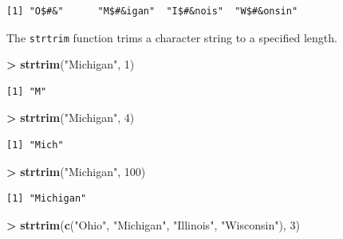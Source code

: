 \documentclass[]{krantz}
\makeatletter
\newenvironment{Shaded}{\begin{snugshade}}{\end{snugshade}}
\newcommand{\KeywordTok}[1]{\textcolor[rgb]{0.27,0.27,0.27}{\textbf{#1}}}
\newcommand{\DecValTok}[1]{\textcolor[rgb]{0.06,0.06,0.06}{#1}}
\newcommand{\StringTok}[1]{\textcolor[rgb]{0.5,0.5,0.5}{#1}}
\newcommand{\OperatorTok}[1]{\textcolor[rgb]{0.43,0.43,0.43}{\textbf{#1}}}
\newcommand{\NormalTok}[1]{#1}
\newenvironment{kframe}{%
\medskip{}
\setlength{\fboxsep}{.8em}
 \def\at@end@of@kframe{}%
 \ifinner\ifhmode%
  \def\at@end@of@kframe{\end{minipage}}%
  \begin{minipage}{\columnwidth}%
 \fi\fi%
 \def\FrameCommand##1{\hskip\@totalleftmargin \hskip-\fboxsep
 \colorbox{shadecolor}{##1}\hskip-\fboxsep
     \hskip-\linewidth \hskip-\@totalleftmargin \hskip\columnwidth}%
 \MakeFramed {\advance\hsize-\width
   \@totalleftmargin\z@ \linewidth\hsize
   \@setminipage}}%
 {\par\unskip\endMakeFramed%
 \at@end@of@kframe}
\renewenvironment{Shaded}{\begin{kframe}}{\end{kframe}}
\makeatother
\begin{document}
\begin{Shaded}
\end{Shaded}

\begin{verbatim}
[1] "O$#&"      "M$#&igan"  "I$#&nois"  "W$#&onsin"
\end{verbatim}

The \texttt{strtrim} function trims a character string to a specified
length.

\begin{Shaded}
\begin{Highlighting}[]
\OperatorTok{>}\StringTok{ }\KeywordTok{strtrim}\NormalTok{(}\StringTok{"Michigan"}\NormalTok{, }\DecValTok{1}\NormalTok{)}
\end{Highlighting}
\end{Shaded}

\begin{verbatim}
[1] "M"
\end{verbatim}

\begin{Shaded}
\begin{Highlighting}[]
\OperatorTok{>}\StringTok{ }\KeywordTok{strtrim}\NormalTok{(}\StringTok{"Michigan"}\NormalTok{, }\DecValTok{4}\NormalTok{)}
\end{Highlighting}
\end{Shaded}

\begin{verbatim}
[1] "Mich"
\end{verbatim}

\begin{Shaded}
\begin{Highlighting}[]
\OperatorTok{>}\StringTok{ }\KeywordTok{strtrim}\NormalTok{(}\StringTok{"Michigan"}\NormalTok{, }\DecValTok{100}\NormalTok{)}
\end{Highlighting}
\end{Shaded}

\begin{verbatim}
[1] "Michigan"
\end{verbatim}

\begin{Shaded}
\begin{Highlighting}[]
\OperatorTok{>}\StringTok{ }\KeywordTok{strtrim}\NormalTok{(}\KeywordTok{c}\NormalTok{(}\StringTok{"Ohio"}\NormalTok{, }\StringTok{"Michigan"}\NormalTok{, }\StringTok{"Illinois"}\NormalTok{, }\StringTok{"Wisconsin"}\NormalTok{), }\DecValTok{3}\NormalTok{)}
\end{Highlighting}
\end{Shaded}
\end{document}
